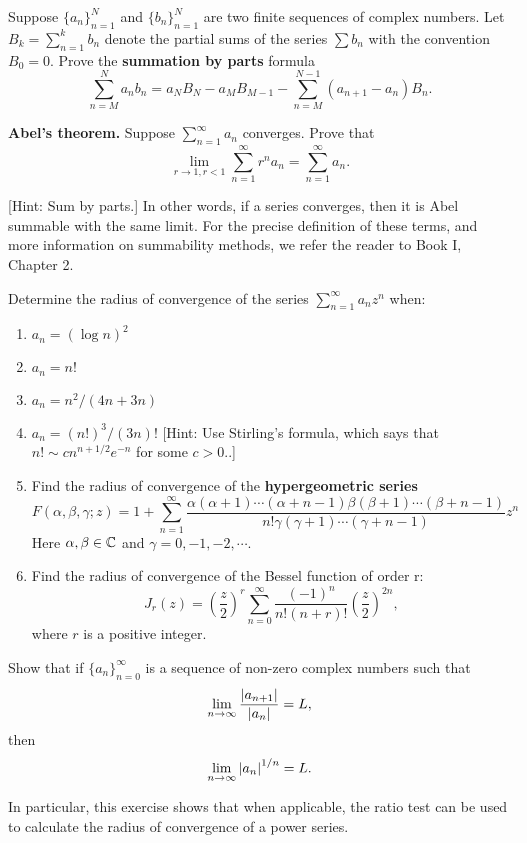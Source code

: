 \begin{exercise}
Suppose $\{a_n\}^N_{n=1}$ and $\{b_n\}^N_{n=1}$ are two finite sequences of complex numbers. Let $B_k = \sum^k_{n=1}b_n$ denote the partial sums of the series $\sum b_n$ with the convention $B_0=0$. Prove the \textbf{summation by parts} formula $$\sum_{n=M}^N a_nb_n = a_NB_N - a_MB_{M-1} - \sum_{n=M}^{N-1}(a_{n+1}-a_n)B_n.$$
\end{exercise}

\begin{exercise}
\textbf{Abel’s theorem.} 
Suppose $\sum_{n=1}^\infty a_n$ converges. Prove that $$\lim_{r\to1, r<1} \sum_{n=1}^\infty r^na_n = \sum_{n=1}^\infty a_n.$$

[Hint: Sum by parts.] In other words, if a series converges, then it is Abel summable with the same limit. For the precise definition of these terms, and more information on summability methods, we refer the reader to Book I, Chapter 2.
\end{exercise}

\begin{exercise}
Determine the radius of convergence of the series $\sum_{n=1}^\infty a_nz^n$ when:

\begin{enumerate}[label=(\alph*)]
\item $a_n = (\log n)^2$
\item $a_n = n!$
\item $a_n = n^2/(4n+3n)$
\item $a_n = (n!)^3/(3n)!$ [Hint: Use Stirling’s formula, which says that $n! \sim cn^{n+1/2}e^{-n}$ for some $c > 0$..]
\item Find the radius of convergence of the \textbf{hypergeometric series} $$F(\alpha, \beta, \gamma; z)=1+\sum_{n=1}^\infty \frac{\alpha(\alpha+1)\cdots(\alpha+n-1)\beta(\beta+1)\cdots(\beta+n-1)}{n!\gamma(\gamma+1)\cdots(\gamma+n-1)}z^n$$
Here $\alpha, \beta \in \mathbb{C}$ and $\gamma = 0, -1, -2, \cdots$.
\item Find the radius of convergence of the Bessel function of order r: $$J_r(z) = \left(\frac{z}{2}\right)^r \sum_{n=0}^\infty \frac{(-1)^n}{n!(n+r)!} \left(\frac{z}{2}\right)^{2n},$$
where $r$ is a positive integer.
\end{enumerate}
\end{exercise}

\begin{exercise}
Show that if $\{a_n\}_{n=0}^\infty$ is a sequence of non-zero complex numbers such that $$\lim_{n\to\infty} \frac{\left\lvert a_{n+1} \right\rvert}{\left\lvert a_n \right\rvert} = L,$$ then $$\lim_{n\to\infty} \left\lvert a_n \right\rvert^{1/n} = L.$$

In particular, this exercise shows that when applicable, the ratio test can be used to calculate the radius of convergence of a power series.
\end{exercise}

